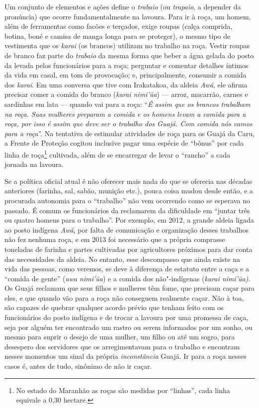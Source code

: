 Um conjunto de elementos e ações define o \emph{trabaio} (ou
\emph{trapaio}, a depender da pronúncia) que ocorre fundamentalmente na
lavoura. Para ir à roça, um homem, além de ferramentas como facões e
terçados, exige roupas (calça comprida, botina, boné e camisa de manga
longa para se proteger), o mesmo tipo de vestimenta que os \emph{karai}
(os brancos) utilizam no trabalho na roça. Vestir roupas de branco faz
parte do \emph{trabaio} da mesma forma que beber a água gelada do posto
da  levada pelos funcionários para a roça; perguntar e comentar
detalhes íntimos da vida em casal, em tom de provocação; e,
principalmente, consumir a comida dos \emph{karai}. Em uma conversa que
tive com Irakatakoa, da aldeia \emph{Awá}, ele afirma precisar comer a
comida do branco (\emph{karai nimi'ũa}) --- arroz, macarrão, carnes e
sardinhas em lata --- quando vai para a roça: ``\emph{É assim que os
brancos trabalham na roça. Suas mulheres preparam a comida e os homens
levam a comida para a roça, por isso é assim que deve ser o trabalho dos
Guajá. Com comida nós vamos para a roça}''. Na tentativa de estimular
atividades de roça para os Guajá da  Caru, a Frente de Proteção
cogitou inclusive pagar uma espécie de ``bônus'' por cada linha de
roça\footnote{No estado do Maranhão as roças são medidas por ``linhas'',
  cada linha equivale a 0,30 hectare.} cultivada, além de se encarregar
de levar o ``rancho'' a cada jornada na lavoura.

Se a política oficial atual é não oferecer mais nada do que se oferecia
nas décadas anteriores (farinha, sal, sabão, munição etc.), pouca coisa
mudou desde então, e a procurada autonomia para o ``trabalho'' não vem
ocorrendo como se esperava no passado. É comum os funcionários da 
reclamarem da dificuldade em ``juntar três ou quatro homens para o
trabalho''. Por exemplo, em 2012, a grande aldeia ligada ao posto
indígena \emph{Awá}, por falta de comunicação e organização desses
trabalhos não fez nenhuma roça, e em 2013 foi necessário que a própria
 comprasse toneladas de farinha e partes cultivadas por
agricultores próximos para dar conta das necessidades da aldeia. No
entanto, esse descompasso que ainda existe na vida das pessoas, como
veremos, se deve à diferença de estatuto entre a caça e a ``comida de
gente'' (\emph{awa nimi'ũa}) e a comida dos não"-indígenas (\emph{karai
nimi'ũa)}. Os Guajá reclamam que seus filhos e mulheres têm fome, que
precisam caçar para eles, e que quando vão para a roça não conseguem
realmente caçar. Não à toa, são capazes de quebrar qualquer acordo
prévio que tenham feito com os funcionários do posto indígena e de
trocar a lavoura por uma promessa de caça, seja por alguém ter
encontrado um rastro ou serem informados por um sonho, ou mesmo para
suprir o desejo de uma mulher, um filho ou até um sogro, para desespero
dos servidores que os arregimentavam para o trabalho e encontram nesses
momentos um sinal da própria \emph{inconstância} Guajá. Ir para a roça
nesses casos é, antes de tudo, sinônimo de não ir caçar.


